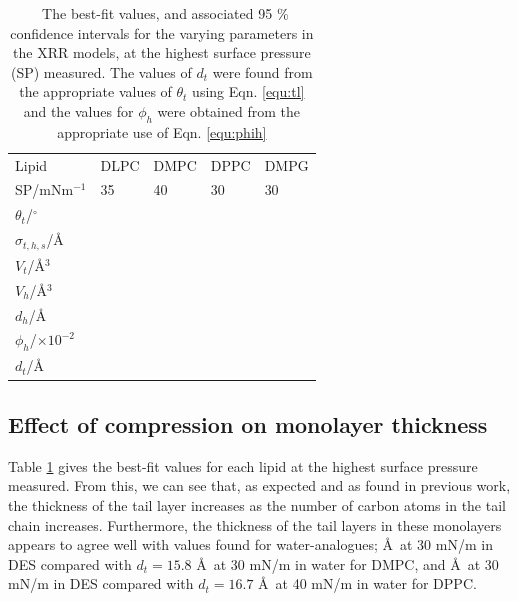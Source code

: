 \documentclass[twoside,twocolumn,9pt]{article}
\begin{document}
\begin{table}
	\small
	\caption{\ The best-fit values, and associated 95 \% confidence intervals for the varying parameters in the XRR models, at the highest surface pressure (SP) measured. The values of $d_t$ were found from the appropriate values of $\theta_t$ using Eqn. \ref{equ:tl} and the values for $\phi_h$ were obtained from the appropriate use of Eqn. \ref{equ:phih}}
	\label{tab:liptab}
	\begin{tabular*}{0.48\textwidth}{@{\extracolsep{\fill}}lllll}
		\hline
		Lipid & DLPC & DMPC & DPPC & DMPG \\
    SP/mNm$^{-1}$ & 35 & 40 & 30 & 30 \\
		\hline
		$\theta_t$/$^\circ$ &  &  &  &  \\
		$\sigma_{t,h,s}$/\AA &  &  &  &  \\
    \hline
    $V_t$/\AA$^3$ &  &  &  &  \\
		$V_h$/\AA$^3$ &  &  &  &  \\
		$d_h$/\AA &  &  &  &  \\
    \hline
    $\phi_h$/$\times10^{-2}$ &  &  &  &  \\
		$d_t$/\AA &  &  &  &  \\
		\hline
	\end{tabular*}
\end{table}
%

\subsection{Effect of compression on monolayer thickness}
Table \ref{tab:liptab} gives the best-fit values for each lipid at the highest surface pressure measured. From this, we can see that, as expected and as found in previous work,\cite{Mohwald1990,Vaknin1991} the thickness of the tail layer increases as the number of carbon atoms in the tail chain increases. Furthermore, the thickness of the tail layers in these monolayers appears to agree well with values found for water-analogues; \AA\ at 30 mN/m in DES compared with $d_t=15.8$ \AA\ at 30 mN/m\cite{Johnson1991} in water for DMPC, and \AA\ at 30 mN/m in DES compared with $d_t=16.7$ \AA\ at 40 mN/m\cite{Helm1987} in water for DPPC.
\end{document}
